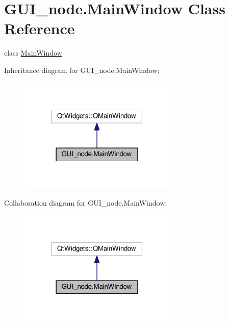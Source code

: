 \hypertarget{classGUI__node_1_1MainWindow}{}\section{G\+U\+I\+\_\+node.\+Main\+Window Class Reference}
\label{classGUI__node_1_1MainWindow}


class \hyperlink{classGUI__node_1_1MainWindow}{Main\+Window}  




Inheritance diagram for G\+U\+I\+\_\+node.\+Main\+Window\+:
\nopagebreak
\begin{figure}[H]
\begin{center}
\leavevmode
\includegraphics[width=213pt]{classGUI__node_1_1MainWindow__inherit__graph}
\end{center}
\end{figure}


Collaboration diagram for G\+U\+I\+\_\+node.\+Main\+Window\+:
\nopagebreak
\begin{figure}[H]
\begin{center}
\leavevmode
\includegraphics[width=213pt]{classGUI__node_1_1MainWindow__coll__graph}
\end{center}
\end{figure}
